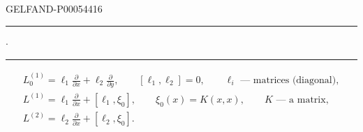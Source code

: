 \begin{GelfandAdjacentEvidence}{GELFAND-P000544}{16}

\hfill\rule{1.3cm}{.35pt}\enspace\(\cdot\)\enspace\rule{1.3cm}{.35pt}\par

\begin{gather*}
L_0^{(1)}=\ell_1\frac{\partial}{\partial x}+\ell_2\frac{\partial}{\partial y},
\qquad [\ell_1,\ell_2]=0,\qquad
\ell_i\text{ — matrices (diagonal)},\\
L^{(1)}=\ell_1\frac{\partial}{\partial x}+[\ell_1,\xi_0],\qquad
\xi_0(x)=K(x,x),\qquad K\text{ — a matrix},\\
L^{(2)}=\ell_2\frac{\partial}{\partial x}+[\ell_2,\xi_0].
\end{gather*}
\end{GelfandAdjacentEvidence}




